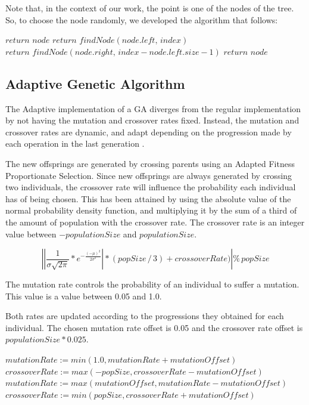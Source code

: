 \documentclass[runningheads]{llncs}
\begin{document}
Note that, in the context of our work, the point is one of the nodes of the tree. So, to choose the node randomly, we developed the algorithm that follows:
\begin{algorithmic}
        \State $return \,\, node$
\Else 
           \State $return \,\, findNode(node.left,\,index)$
           \State $return \,\, findNode(node.right,\,index - node.left.size - 1)$
       \Else
	 \State $return \,\, node$
       \EndIf
\EndIf
\end{algorithmic}


\subsection{Adaptive Genetic Algorithm}
The Adaptive implementation of a GA diverges from the regular implementation by not having the mutation and crossover rates fixed. Instead, the mutation and crossover rates are dynamic, and adapt depending on the progression made by each operation in the last generation \cite{adaptativeCrossOverMutation}.

The new offsprings are generated by crossing parents using an Adapted Fitness Proportionate Selection. Since new offsprings are always generated by crossing two individuals, the crossover rate will influence the probability each individual has of being chosen. This has been attained by using the absolute value of the normal probability density function, and multiplying it by the sum of a third of the amount of population with the crossover rate. The crossover rate is an integer value between \(-populationSize\) and \(populationSize\).

\[ \left |\left | \frac{1}{\sigma \sqrt{2\pi}}*e^{-\frac{(-\mu)^2}{2\sigma^2}} \right | * (popSize\,/\,3) + crossoverRate)  \right | \%  \, popSize \]	

The mutation rate controls the probability of an individual to suffer a mutation. This value is a value between 0.05 and 1.0.

Both rates are updated according to the progressions they obtained for each individual. The chosen mutation rate offset is 0.05 and the crossover rate offset is \(populationSize * 0.025\).

\begin{algorithmic}
        \State $mutationRate := min(1.0, mutationRate + mutationOffset)$
        \State $crossoverRate := max(-popSize, crossoverRate - mutationOffset)$
\EndIf
{}
        \State $mutationRate := max(mutationOffset, mutationRate - mutationOffset)$
        \State $crossoverRate := min(popSize, crossoverRate + mutationOffset)$
\EndIf
\end{algorithmic}
\end{document}
